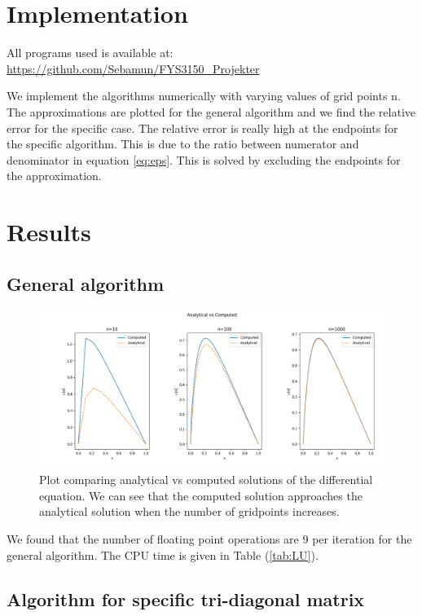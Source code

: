 \documentclass[norsk,a4paper,12pt]{article}
\begin{document}
\section{Implementation}

All programs used is available at: \\
\url{https://github.com/Sebamun/FYS3150_Projekter}

We implement the algorithms numerically with varying values of grid points n. The approximations are plotted for the general algorithm and we find the relative error for the specific case. The relative error is really high at the endpoints for the specific algorithm. This is due to the ratio between numerator and denominator in equation \ref{eq:eps}. This is solved by excluding the endpoints for the approximation. 

\section{Results}

\subsection{General algorithm}

\begin{figure}[H]
	\centering
	\includegraphics[width=\linewidth]{1b.png}
	\caption{Plot comparing analytical vs computed solutions of the differential equation. We can see that the computed solution approaches the analytical solution when the number of gridpoints increases.}
	\label{fig:1bplot}
\end{figure}

We found that the number of floating point operations are 9 per iteration for the general algorithm. The CPU time is given in Table (\ref{tab:LU}).

\subsection{Algorithm for specific tri-diagonal matrix}
\end{document}
